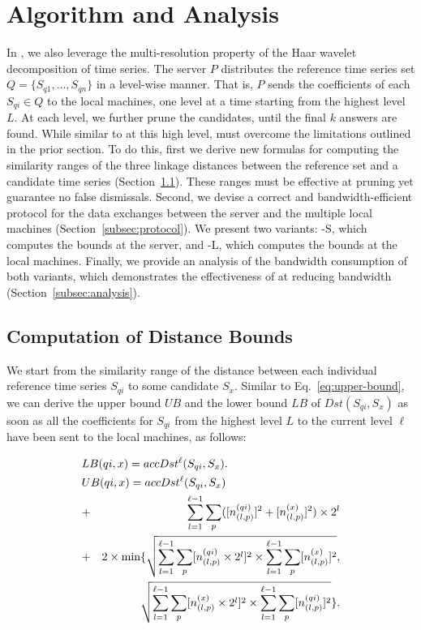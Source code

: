 \section{\MSWaveH{} Algorithm and Analysis}
\label{sec:framework}

In \MSWave{}, we also leverage the multi-resolution property of the
Haar wavelet decomposition of time series. The server $P$ distributes
the reference time series set $Q=\{S_{q1},\ldots,S_{qn}\}$ in a
level-wise manner. That is, $P$ sends the coefficients of each $S_{qi}
\in Q$ to the local machines, one level at a time starting from the
highest level $L$.  At each level, we further prune the candidates,
until the final $k$ answers are found.  While similar to \LeeWave{} at
this high level, \MSWave{} must overcome the limitations outlined in
the prior section.  To do this, first we derive new formulas for
computing the similarity ranges of the three linkage distances between
the reference set and a candidate time series
(Section~\ref{subsec:newbounds}).  These ranges must be effective at
pruning yet guarantee no false dismissals.  Second, we devise a
correct and bandwidth-efficient protocol for the data exchanges
between the server and the multiple local machines
(Section~\ref{subsec:protocol}).  We present two variants:
\MSWave-S{}, which computes the bounds at the server, and \MSWave-L{},
which computes the bounds at the local machines.  Finally, we provide
an analysis of the bandwidth consumption of both variants,
which demonstrates the effectiveness of \MSWave{} at reducing bandwidth
(Section~\ref{subsec:analysis}).

\vspace{-0.1in}
\subsection{Computation of Distance Bounds}\label{subsec:newbounds}

We start from the similarity range of the distance between each
individual reference time series $S_{qi}$ to some candidate
$S_x$. Similar to Eq.~\eqref{eq:upper-bound}, we can derive the upper
bound $UB$ and the lower bound $LB$ of $Dst(S_{qi},S_x)$ as soon as all the
coefficients for $S_{qi}$ from the highest level $L$ to the current level
$\ell$ have been sent to the local machines, as follows:

{\small
\begin{eqnarray}
\lefteqn{LB(qi,x) =  accDst^{\ell}(S_{qi},S_{x}).} \label{eq:single-LB} \\
\lefteqn{UB(qi,x) = accDst^{\ell }(S_{qi},S_{x})} \notag \\
& + & \sum_{l=1}^{\ell-1}
 \sum_{p}([n_{(l,p)}^{(qi)}]^{2}+[n_{(l,p)}^{(x)}]^{2}) \times 2^{l} \notag \\
& + & 2 \times \min\{\sqrt{\sum_{l=1}^{\ell-1}\sum_{p}[n_{(l,p)}^{(qi)}
 \times 2^{l}]^{2} \times \sum_{l=1}^{\ell-1}\sum_{p}[n_{(l,p)}^{(x)}]^{2}},
   \notag \\
&&\sqrt{\sum_{l=1}^{\ell-1}\sum_{p}[n_{(l,p)}^{(x)} \times 2^{l}]^{2} \times 
        \sum_{l=1}^{\ell-1}\sum_{p}[n_{(l,p)}^{(qi)}]^{2}}\}.
 \label{eq:single-UB}
\end{eqnarray}
}

